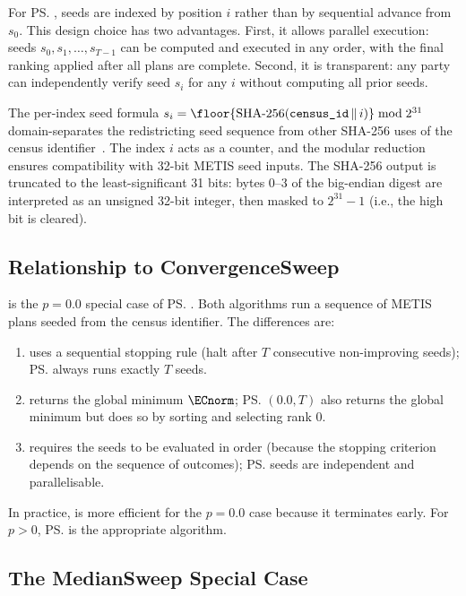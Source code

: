 For \ps{}, seeds are indexed by position $i$ rather than by sequential
advance from $s_0$.
This design choice has two advantages.
First, it allows parallel execution: seeds $s_0, s_1, \ldots, s_{T-1}$
can be computed and executed in any order, with the final ranking applied
after all plans are complete.
Second, it is transparent: any party can independently verify seed $s_i$
for any $i$ without computing all prior seeds.

The per-index seed formula $s_i = \floor{\text{SHA-256}(\texttt{census\_id}
\,\|\, i)} \bmod 2^{31}$ domain-separates the redistricting seed sequence
from other SHA-256 uses of the census identifier~\citep{sha256nist}.
The index $i$ acts as a counter, and the modular reduction ensures
compatibility with 32-bit METIS seed inputs.
The SHA-256 output is truncated to the least-significant 31 bits: bytes 0--3
of the big-endian digest are interpreted as an unsigned 32-bit integer, then
masked to $2^{31} - 1$ (i.e., the high bit is cleared).

\subsection{Relationship to ConvergenceSweep}

\cs{} is the $p = 0.0$ special case of \ps{}.
Both algorithms run a sequence of METIS plans seeded from the census
identifier.
The differences are:
\begin{enumerate}
\item \cs{} uses a sequential stopping rule (halt after $T$ consecutive
      non-improving seeds); \ps{} always runs exactly $T$ seeds.
\item \cs{} returns the global minimum $\ECnorm$; \ps{}$(0.0, T)$ also
      returns the global minimum but does so by sorting and selecting rank 0.
\item \cs{} requires the seeds to be evaluated in order (because the stopping
      criterion depends on the sequence of outcomes); \ps{} seeds are
      independent and parallelisable.
\end{enumerate}

In practice, \cs{} is more efficient for the $p = 0.0$ case because it
terminates early.
For $p > 0$, \ps{} is the appropriate algorithm.

\subsection{The MedianSweep Special Case}

